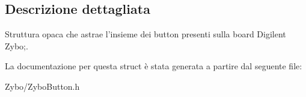 \subsection{Descrizione dettagliata}
Struttura opaca che astrae l'insieme dei button presenti sulla board Digilent Zybo;. 

La documentazione per questa struct è stata generata a partire dal seguente file\+:\begin{DoxyCompactItemize}
\item 
Zybo/Zybo\+Button.\+h\end{DoxyCompactItemize}
